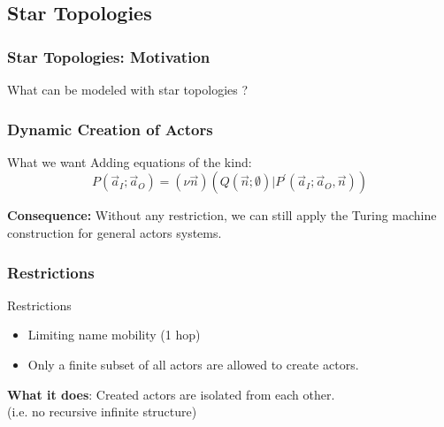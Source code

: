 \documentclass{beamer}
\theoremstyle{remark}
\theoremstyle{definition}
\begin{document}
\subsection{Star Topologies}

\begin{frame}
\frametitle{Star Topologies: Motivation}
What can be modeled with star topologies ?
\begin{center}

\vspace{15pt}

\end{center}
\end{frame}

\begin{frame}
\frametitle{Dynamic Creation of Actors}
\begin{block}{What we want}
Adding equations of the kind:
\begin{equation*}
P(\vec a_I; \vec a_O) = (\nu \vec n)(Q(\vec n;\emptyset) | P^\prime(\vec a_I ; \vec a_O , \vec n))
\end{equation*}
\end{block}

\vspace{20pt}
\textbf{Consequence:} 
Without any restriction, we can still apply the Turing machine construction for general actors systems.
\end{frame}

\begin{frame}
\frametitle{Restrictions}
\begin{block}{Restrictions}
\begin{itemize}
\item Limiting name mobility (1 hop)
\item Only a finite subset of all actors are allowed to create actors.
\end{itemize}
\end{block}

\vspace{10pt}

\textbf{What it does}:
Created actors are \alert{isolated} from each other.\\
(i.e. no recursive infinite structure)

\end{frame}
\end{document}
